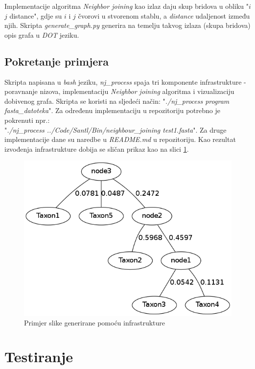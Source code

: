 \documentclass[times, utf8, seminar, numeric]{fer}
\begin{document}
Implementacije algoritma \emph{Neighbor joining} kao izlaz daju skup bridova u obliku "$i$ $j$ distance", gdje su $i$ i $j$ čvorovi u stvorenom stablu, a \emph{distance} udaljenost između njih. Skripta \emph{generate\_graph.py} generira na temelju takvog izlaza (skupa bridova) opis grafa u \emph{DOT} jeziku.

\subsection{Pokretanje primjera}

Skripta napisana u \emph{bash} jeziku, \emph{nj\_process} spaja tri komponente infrastrukture - poravnanje nizova, implementaciju  \emph{Neighbor joining} algoritma i vizualizaciju dobivenog grafa. Skripta se koristi na sljedeći način: "\emph{./nj\_process program fasta\_datoteka}". 
Za određenu implementaciju u repozitoriju potrebno je pokrenuti npr.:\\ "\emph{./nj\_process ../Code/Santl/Bin/neighbour\_joining test1.fasta}".
Za druge implementacije dane su naredbe u \emph{README.md} u repozitoriju. Kao rezultat izvođenja infrastrukture dobija se sličan prikaz kao na slici \ref{ref:infra}.

\begin{figure}[htb]
\centering
\includegraphics[scale=0.6]{./img/infra.png}
\caption{Primjer slike generirane pomoću infrastrukture}
\label{ref:infra}
\end{figure}

\newpage
\section{Testiranje}
\end{document}
